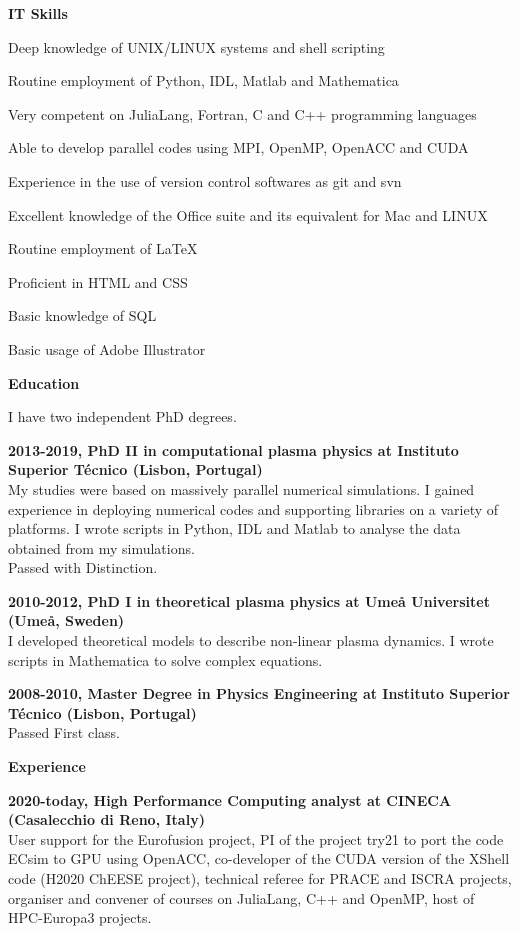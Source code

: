 \documentclass[a4paper,10pt,final]{memoir}
\newcommand{\Sep}{\vspace{0.8cm}}
\newcommand{\SmallSep}{\vspace{0.3cm}}
\newcommand{\CVSection}[1]
	{\Large\textbf{#1}\par
	\SmallSep\normalsize\normalfont}
\newcommand{\CVItem}[1]
	{\textbf{\color{RoyalBlue} #1}}
\begin{document}
\CVItem{IT Skills}
\begin{compactitem}[\color{RoyalBlue}$\circ$]
\item Deep knowledge of UNIX/LINUX systems and shell scripting
\item Routine employment of Python, IDL, Matlab and Mathematica
\item Very competent on JuliaLang, Fortran, C and C++ programming languages
\item Able to develop parallel codes using MPI, OpenMP, OpenACC and CUDA
\item Experience in the use of version control softwares as git and svn
\item Excellent knowledge of the Office suite and its equivalent for Mac and LINUX  
\item Routine employment of \LaTeX
\item Proficient in HTML and CSS
\item Basic knowledge of SQL
\item Basic usage of Adobe Illustrator
\end{compactitem}

\clearpage
\framebreak
\framebreak

\CVSection{Education}

I have two independent PhD degrees.
\SmallSep

\CVItem{2013-2019, PhD II in computational plasma physics at Instituto Superior T\'ecnico (Lisbon, Portugal)}\\
My studies were based on massively parallel numerical simulations. I gained experience in deploying numerical codes and supporting libraries on a variety of platforms. I wrote scripts in Python, IDL and Matlab to analyse the data obtained from my simulations.\\
Passed with Distinction.
\SmallSep

\CVItem{2010-2012, PhD I in theoretical plasma physics at Ume\r{a} Universitet (Ume\r{a}, Sweden)}\\
I developed theoretical models to describe non-linear plasma dynamics. I wrote scripts in Mathematica to solve complex equations.
\SmallSep

\CVItem{2008-2010, Master Degree in Physics Engineering at Instituto Superior T\'ecnico (Lisbon, Portugal)}\\
Passed First class.
\Sep

\CVSection{Experience}
\CVItem{2020-today, High Performance Computing analyst at CINECA (Casalecchio di Reno, Italy)}\\
User support for the Eurofusion project, PI of the project try21 to port the code ECsim to GPU using OpenACC, co-developer of the CUDA version of the XShell code (H2020 ChEESE project), technical referee for PRACE and ISCRA projects, organiser and convener of courses on JuliaLang, C++ and OpenMP, host of HPC-Europa3 projects.
\SmallSep
\end{document}
